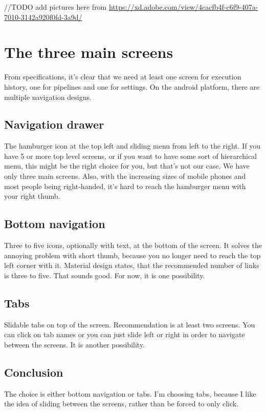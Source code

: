//TODO add pictures here from
\url{https://xd.adobe.com/view/4cacfb4f-c6f9-407a-7010-3142a920f0fd-3a9d/}

\section{The three main screens}
From specifications, it's clear that we need at least one screen for execution history, one for pipelines and one for settings.
On the android platform, there are multiple navigation designs.

\subsection{Navigation drawer}
The hamburger icon at the top left and sliding menu from left to the right. If you have 5 or more top level screens, or if you want to have some sort of hierarchical menu, this might be the right choice for you, but that's not our case. We have only three main screens.
Also, with the increasing sizes of mobile phones and most people being right-handed, it's hard to reach the hamburger menu with your right thumb.

\subsection{Bottom navigation}
Three to five icons, optionally with text, at the bottom of the screen. It solves the annoying problem with short thumb, because you no longer need to reach the top left corner with it.
Material design states, that the recommended number of links is three to five. That sounds good. For now, it is one possibility.

\subsection{Tabs}
Slidable tabs on top of the screen. Recommendation is at least two screens.
You can click on tab names or you can just slide left or right in order to navigate between the screens. It is another possibility.

\subsection{Conclusion}
The choice is either bottom navigation or tabs. I'm choosing tabs, because I like the idea of sliding between the screens, rather than be forced to only click.


